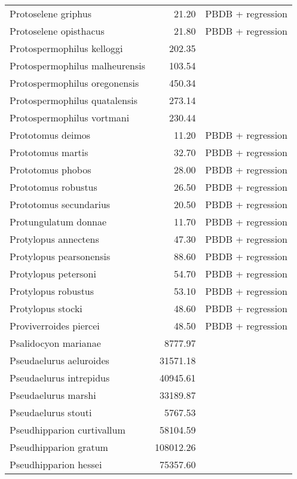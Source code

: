 \begin{table}[ht]
\begin{tabular}{lrl}
  Protoselene griphus & 21.20 & PBDB + regression \\ 
  Protoselene opisthacus & 21.80 & PBDB + regression \\ 
  Protospermophilus kelloggi & 202.35 & \cite{Tomiya2013} \\ 
  Protospermophilus malheurensis & 103.54 & \cite{Tomiya2013} \\ 
  Protospermophilus oregonensis & 450.34 & \cite{Tomiya2013} \\ 
  Protospermophilus quatalensis & 273.14 & \cite{Tomiya2013} \\ 
  Protospermophilus vortmani & 230.44 & \cite{Tomiya2013} \\ 
  Prototomus deimos & 11.20 & PBDB + regression \\ 
  Prototomus martis & 32.70 & PBDB + regression \\ 
  Prototomus phobos & 28.00 & PBDB + regression \\ 
  Prototomus robustus & 26.50 & PBDB + regression \\ 
  Prototomus secundarius & 20.50 & PBDB + regression \\ 
  Protungulatum donnae & 11.70 & PBDB + regression \\ 
  Protylopus annectens & 47.30 & PBDB + regression \\ 
  Protylopus pearsonensis & 88.60 & PBDB + regression \\ 
  Protylopus petersoni & 54.70 & PBDB + regression \\ 
  Protylopus robustus & 53.10 & PBDB + regression \\ 
  Protylopus stocki & 48.60 & PBDB + regression \\ 
  Proviverroides piercei & 48.50 & PBDB + regression \\ 
  Psalidocyon marianae & 8777.97 & \cite{Tomiya2013} \\ 
  Pseudaelurus aeluroides & 31571.18 & \cite{Tomiya2013} \\ 
  Pseudaelurus intrepidus & 40945.61 & \cite{Tomiya2013} \\ 
  Pseudaelurus marshi & 33189.87 & \cite{Tomiya2013} \\ 
  Pseudaelurus stouti & 5767.53 & \cite{Tomiya2013} \\ 
  Pseudhipparion curtivallum & 58104.59 & \cite{Tomiya2013} \\ 
  Pseudhipparion gratum & 108012.26 & \cite{Tomiya2013} \\ 
  Pseudhipparion hessei & 75357.60 & \cite{Tomiya2013} \\ 

\end{tabular}
\end{table}
